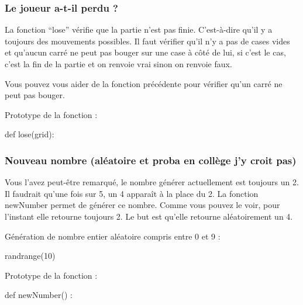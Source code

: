 \subsubsection{Le joueur a-t-il perdu ?}
La fonction “lose” vérifie que la partie n’est pas finie. C’est-à-dire qu’il y a toujours des mouvements possibles.
Il faut vérifier qu’il n’y a pas de cases vides et qu'aucun carré ne peut pas bouger sur une case à côté de lui, si c’est le cas, c'est la fin de la partie et on renvoie vrai sinon on renvoie faux.


Vous pouvez vous aider de la fonction précédente pour vérifier qu'un carré ne peut pas bouger.


Prototype de la fonction :
\begin{pythonCode}
def lose(grid):
\end{pythonCode}












\subsubsection{Nouveau nombre (aléatoire et proba en collège j'y croit pas)} 
Vous l'avez peut-être remarqué, le nombre générer actuellement est toujours un 2. Il faudrait qu'une fois sur 5, un 4 apparaît à la place du 2. 
La fonction newNumber permet de générer ce nombre. Comme vous pouvez le voir, pour l'instant elle retourne toujours 2.
Le but est qu'elle retourne aléatoirement un 4.  


Génération de nombre entier aléatoire compris entre 0 et 9 :
\begin{pythonCode}
randrange(10)
\end{pythonCode}




Prototype de la fonction :
\begin{pythonCode}
def newNumber() :
\end{pythonCode}




